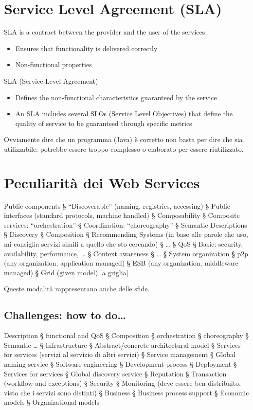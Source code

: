 \section{Service Level Agreement (SLA)}
SLA is a contract between the provider and the user of the services.
\begin{itemize}
    \item Ensures that functionality is delivered correctly
    \item Non-functional properties
\end{itemize}
SLA (Service Level Agreement)
\begin{itemize}
    \item Defines the non-functional characteristics guaranteed by the service
    \item An SLA includes several SLOs (Service Level Objectives) that define the quality of service to be guaranteed through specific metrics
\end{itemize}
Ovviamente dire che un programma (Java) è corretto non basta per dire che sia utilizzabile: potrebbe essere troppo complesso o elaborato per essere riutilizzato.

\section{Peculiarità dei Web Services}
Public components
§ “Discoverable” (naming, registries, accessing)
§ Public interfaces (standard protocols, machine handled)
§ Composability
§ Composite services: “orchestration”
§ Coordination: “choreography”
§ Semantic Descriptions
§ Discovery
§ Composition
§ Recommending Systems (in base alle parole che uso, mi consiglia servizi simili a quello che sto cercando)
§ …
§ QoS
§ Basic: security, availability, performance, …
§ Context awareness
§ …
§ System organization
§ p2p (any organization, application managed)
§ ESB (any organization, middleware managed)
§ Grid (given model) [a griglia]

Queste modalità rappresentano anche delle sfide.
\subsection{Challenges: how to do…}
Description
§ functional and QoS
§ Composition
§ orchestration
§ choreography
§ Semantic …
§ Infrastructure
§ Abstract/concrete architectural model
§ Services for services (servizi al servizio di altri servizi)
§ Service management
§ Global naming service
§ Software engineering
§ Development process
§ Deployment
§ Services for services
§ Global discovery service
§ Reputation
§ Transaction (workflow and exceptions)
§ Security
§ Monitoring (deve essere ben distribuito, visto che i servizi sono distinti)
§ Business
§ Business process support
§ Economic models
§ Organizational models

